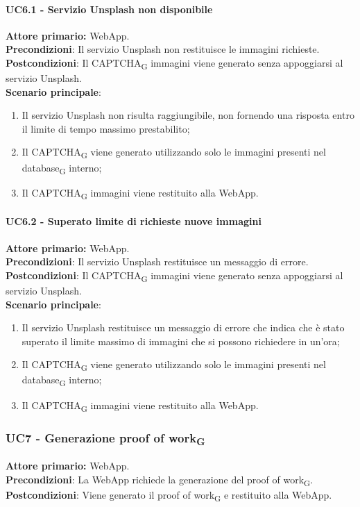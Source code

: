 \paragraph{UC6.1 - Servizio Unsplash non disponibile}
\textbf{Attore primario:} WebApp.\\
\textbf{Precondizioni}: Il servizio Unsplash non restituisce le immagini richieste.\\
\textbf{Postcondizioni}: Il CAPTCHA\textsubscript{G} immagini viene generato senza appoggiarsi al servizio Unsplash.\\

\textbf{Scenario principale}:
\begin{enumerate}
    \item Il servizio Unsplash non risulta raggiungibile, non fornendo una risposta entro il limite di tempo massimo prestabilito;
    \item Il CAPTCHA\textsubscript{G} viene generato utilizzando solo le immagini presenti nel database\textsubscript{G} interno;
    \item Il CAPTCHA\textsubscript{G} immagini viene restituito alla WebApp.
\end{enumerate}

\paragraph{UC6.2 - Superato limite di richieste nuove immagini}
\textbf{Attore primario:} WebApp.\\
\textbf{Precondizioni}: Il servizio Unsplash restituisce un messaggio di errore.\\
\textbf{Postcondizioni}: Il CAPTCHA\textsubscript{G} immagini viene generato senza appoggiarsi al servizio Unsplash.\\

\textbf{Scenario principale}:
\begin{enumerate}
    \item Il servizio Unsplash restituisce un messaggio di errore che indica che è stato superato il limite massimo di immagini che si possono richiedere in un'ora;
    \item Il CAPTCHA\textsubscript{G} viene generato utilizzando solo le immagini presenti nel database\textsubscript{G} interno;
    \item Il CAPTCHA\textsubscript{G} immagini viene restituito alla WebApp.
\end{enumerate}

\subsubsection{UC7  - Generazione proof of work\textsubscript{G}}
\textbf{Attore primario:} WebApp.\\
\textbf{Precondizioni}: La WebApp richiede la generazione del proof of work\textsubscript{G}.\\
\textbf{Postcondizioni}: Viene generato il proof of work\textsubscript{G} e restituito alla WebApp.\\

